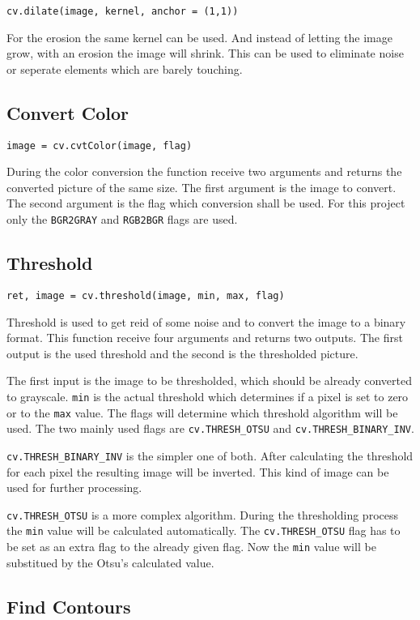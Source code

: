 \texttt{cv.dilate(image, kernel, anchor = (1,1))}

For the erosion the same kernel can be used.
And instead of letting the image grow, with an erosion the image will shrink.
This can be used to eliminate noise or seperate elements which are barely touching.

\subsection{Convert Color}

\texttt{image = cv.cvtColor(image, flag)}

During the color conversion the function receive two arguments and returns the converted picture of the same size.
The first argument is the image to convert.
The second argument is the flag which conversion shall be used.
For this project only the \texttt{BGR2GRAY} and \texttt{RGB2BGR} flags are used.

\subsection{Threshold}

\texttt{ret, image = cv.threshold(image, min, max, flag)}

Threshold is used to get reid of some noise and to convert the image to a binary format.
This function receive four arguments and returns two outputs.
The first output is the used threshold and the second is the thresholded picture.

The first input is the image to be thresholded, which should be already converted to grayscale.
\texttt{min} is the actual threshold which determines if a pixel is set to zero or to the \texttt{max} value.
The flags will determine which threshold algorithm will be used.
The two mainly used flags are \texttt{cv.THRESH\_OTSU} and \texttt{cv.THRESH\_BINARY\_INV}.

\texttt{cv.THRESH\_BINARY\_INV} is the simpler one of both.
After calculating the threshold for each pixel the resulting image will be inverted.
This kind of image can be used for further processing.

\texttt{cv.THRESH\_OTSU} is a more complex algorithm.
During the thresholding process the \texttt{min} value will be calculated automatically.
The \texttt{cv.THRESH\_OTSU} flag has to be set as an extra flag to the already given flag.
Now the \texttt{min} value will be substitued by the Otsu's calculated value.

\subsection{Find Contours}

